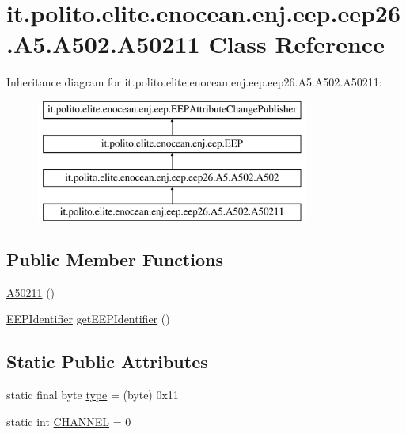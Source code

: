 \hypertarget{classit_1_1polito_1_1elite_1_1enocean_1_1enj_1_1eep_1_1eep26_1_1_a5_1_1_a502_1_1_a50211}{}\section{it.\+polito.\+elite.\+enocean.\+enj.\+eep.\+eep26.\+A5.\+A502.\+A50211 Class Reference}
\label{classit_1_1polito_1_1elite_1_1enocean_1_1enj_1_1eep_1_1eep26_1_1_a5_1_1_a502_1_1_a50211}
Inheritance diagram for it.\+polito.\+elite.\+enocean.\+enj.\+eep.\+eep26.\+A5.\+A502.\+A50211\+:\begin{figure}[H]
\begin{center}
\leavevmode
\includegraphics[height=4.000000cm]{classit_1_1polito_1_1elite_1_1enocean_1_1enj_1_1eep_1_1eep26_1_1_a5_1_1_a502_1_1_a50211}
\end{center}
\end{figure}
\subsection*{Public Member Functions}
\begin{DoxyCompactItemize}
\item 
\hyperlink{classit_1_1polito_1_1elite_1_1enocean_1_1enj_1_1eep_1_1eep26_1_1_a5_1_1_a502_1_1_a50211_ab48a58567508310f064c710bd1647d00}{A50211} ()
\item 
\hyperlink{classit_1_1polito_1_1elite_1_1enocean_1_1enj_1_1eep_1_1_e_e_p_identifier}{E\+E\+P\+Identifier} \hyperlink{classit_1_1polito_1_1elite_1_1enocean_1_1enj_1_1eep_1_1eep26_1_1_a5_1_1_a502_1_1_a50211_ac7c0de6128a8a96ee542495d50978753}{get\+E\+E\+P\+Identifier} ()
\end{DoxyCompactItemize}
\subsection*{Static Public Attributes}
\begin{DoxyCompactItemize}
\item 
static final byte \hyperlink{classit_1_1polito_1_1elite_1_1enocean_1_1enj_1_1eep_1_1eep26_1_1_a5_1_1_a502_1_1_a50211_a732e980c4d766ace6ccc995600bdff3e}{type} = (byte) 0x11
\item 
static int \hyperlink{classit_1_1polito_1_1elite_1_1enocean_1_1enj_1_1eep_1_1eep26_1_1_a5_1_1_a502_1_1_a50211_a1ca77e1de5ec7586bc2a41b77dd490bd}{C\+H\+A\+N\+N\+EL} = 0
\end{DoxyCompactItemize}
